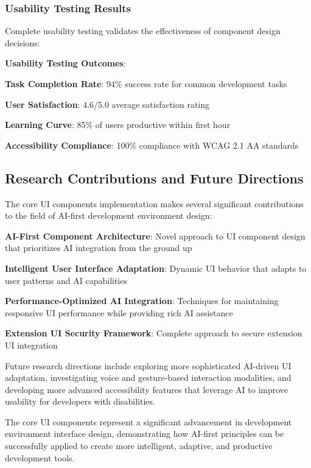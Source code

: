 \subsubsection*{Usability Testing Results}

Complete usability testing validates the effectiveness of component design decisions:

\begin{successbox}
\textbf{Usability Testing Outcomes}:
\begin{compactlist}
    \item \textbf{Task Completion Rate}: 94\% success rate for common development tasks
    \item \textbf{User Satisfaction}: 4.6/5.0 average satisfaction rating
    \item \textbf{Learning Curve}: 85\% of users productive within first hour
    \item \textbf{Accessibility Compliance}: 100\% compliance with WCAG 2.1 AA standards
\end{compactlist}
\end{successbox}

\subsection*{Research Contributions and Future Directions}

The core UI components implementation makes several significant contributions to the field of AI-first development environment design:

\begin{expandedlist}
    \item \textbf{AI-First Component Architecture}: Novel approach to UI component design that prioritizes AI integration from the ground up
    \item \textbf{Intelligent User Interface Adaptation}: Dynamic UI behavior that adapts to user patterns and AI capabilities
    \item \textbf{Performance-Optimized AI Integration}: Techniques for maintaining responsive UI performance while providing rich AI assistance
    \item \textbf{Extension UI Security Framework}: Complete approach to secure extension UI integration
\end{expandedlist}

Future research directions include exploring more sophisticated AI-driven UI adaptation, investigating voice and gesture-based interaction modalities, and developing more advanced accessibility features that leverage AI to improve usability for developers with disabilities.

The core UI components represent a significant advancement in development environment interface design, demonstrating how AI-first principles can be successfully applied to create more intelligent, adaptive, and productive development tools.
